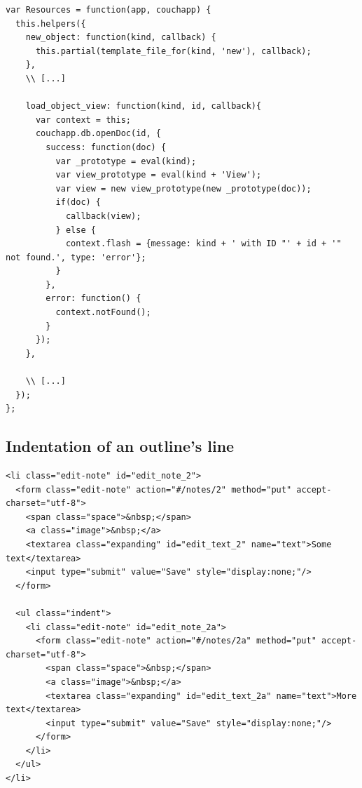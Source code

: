 \lstset{language=javascript}
\medskip 
\begin{lstlisting}[label=code:resources, caption=Extract from {\fontfamily{pcr}\selectfont /\_attachments/app/lib/resources.js}]
var Resources = function(app, couchapp) {
  this.helpers({
    new_object: function(kind, callback) {
      this.partial(template_file_for(kind, 'new'), callback);
    },
    \\ [...]
    
    load_object_view: function(kind, id, callback){
      var context = this;
      couchapp.db.openDoc(id, {
        success: function(doc) {
          var _prototype = eval(kind);
          var view_prototype = eval(kind + 'View');
          var view = new view_prototype(new _prototype(doc));
          if(doc) {            
            callback(view);            
          } else {
            context.flash = {message: kind + ' with ID "' + id + '" not found.', type: 'error'};
          }
        },
        error: function() {
          context.notFound();
        }
      });
    },

    \\ [...]
  });
};
\end{lstlisting}



\subsection{Indentation of an outline's line}


\lstset{language=html}
\medskip 
\begin{lstlisting}[label=code:outline-indent, caption=Line with child nodes]
<li class="edit-note" id="edit_note_2">
  <form class="edit-note" action="#/notes/2" method="put" accept-charset="utf-8">
    <span class="space">&nbsp;</span>
    <a class="image">&nbsp;</a>
    <textarea class="expanding" id="edit_text_2" name="text">Some text</textarea>
    <input type="submit" value="Save" style="display:none;"/>
  </form>

  <ul class="indent">
    <li class="edit-note" id="edit_note_2a">
      <form class="edit-note" action="#/notes/2a" method="put" accept-charset="utf-8">
        <span class="space">&nbsp;</span>
        <a class="image">&nbsp;</a>
        <textarea class="expanding" id="edit_text_2a" name="text">More text</textarea>
        <input type="submit" value="Save" style="display:none;"/>
      </form>
    </li>
  </ul>
</li>
\end{lstlisting}




